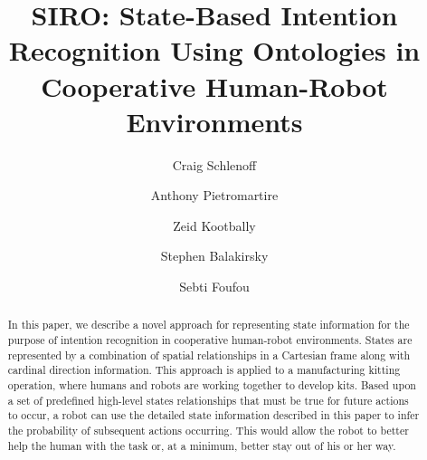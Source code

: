 \documentclass[final,1p,times]{elsarticle}
\begin{document}
\begin{frontmatter}



\title{SIRO: State-Based Intention Recognition Using Ontologies in Cooperative Human-Robot Environments}

 \author[nist,le2i]{Craig Schlenoff}

 \author[nist]{Anthony Pietromartire}

 \author[umd]{Zeid Kootbally}

 \author[nist]{Stephen Balakirsky}

 \author[qatar,le2i]{Sebti Foufou}

 \address[nist]{National Institute of Standards and Technology (NIST), 100 Bureau Drive, Stop 8230, Gaithersburg MD 20899 USA}
 \address[le2i]{University of Burgundy, LE2i Lab, Dijon, France}
 \address[qatar]{Computer Science and Engineering Department Qatar University, Doha Qatar}
 \address[umd]{University of Maryland, Department of Mechanical Engineering, College Park MD 20742 USA}


\begin{abstract}
In this paper, we describe a novel approach for representing state information for the purpose of intention recognition in cooperative human-robot environments. States are represented by a combination of spatial relationships in a Cartesian frame along with cardinal direction information. This approach is applied to a manufacturing kitting operation, where humans and robots are working together to develop kits. Based upon a set of predefined high-level states relationships that must be true for future actions to occur, a robot can use the detailed state information described in this paper to infer the probability of subsequent actions occurring. This would allow the robot to better help the human with the task or, at a minimum, better stay out of his or her way.
\end{abstract}


\end{frontmatter}
\end{document}
